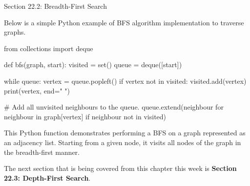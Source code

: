 \begin{notes}{Section 22.2: Breadth-First Search}
    \begin{highlight}
        Below is a simple Python example of BFS algorithm implementation to traverse graphs.
    \begin{code}[Python]
    from collections import deque
    
    def bfs(graph, start):
        visited = set()
        queue = deque([start])
        
        while queue:
            vertex = queue.popleft()
            if vertex not in visited:
                visited.add(vertex)
                print(vertex, end=" ")
                
                # Add all unvisited neighbours to the queue.
                queue.extend(neighbour for neighbour in graph[vertex] if neighbour not in visited)
    \end{code}
        
        This Python function demonstrates performing a BFS on a graph represented as an adjacency list. Starting from a given node, it visits all nodes of the graph in the breadth-first manner.
    \end{highlight}
\end{notes}

The next section that is being covered from this chapter this week is \textbf{Section 22.3: Depth-First Search}.


